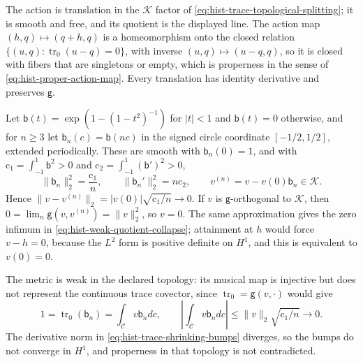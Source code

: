 The action is translation in the \(\mathcal K\) factor of
\eqref{eq:hist-trace-topological-splitting}; it is smooth and free, and its
quotient is the displayed line. The action map \((h,q)\mapsto(q+h,q)\) is a
homeomorphism onto the closed relation
\(\{(u,q):\operatorname{tr}_0(u-q)=0\}\), with inverse \((u,q)\mapsto(u-q,q)\),
so it is closed with fibers that are singletons or empty, which is properness
in the sense of \eqref{eq:hist-proper-action-map}. Every translation has
identity derivative and preserves \(\mathsf g\).

Let \(\mathsf b(t)=\exp(1-(1-t^2)^{-1})\) for \(|t|<1\) and \(\mathsf b(t)=0\)
otherwise, and for \(n\geq3\) let \(\mathsf b_n(c)=\mathsf b(nc)\) in the signed
circle coordinate \([-1/2,1/2]\), extended periodically. These are smooth with
\(\mathsf b_n(0)=1\), and with \(\mathrm c_1=\int_{-1}^1\mathsf b^2>0\) and
\(\mathrm c_2=\int_{-1}^1(\mathsf b')^2>0\),
\begin{equation}
\|\mathsf b_n\|_2^2=\frac{\mathrm c_1}{n},
\qquad
\|\mathsf b_n'\|_2^2=n\mathrm c_2,
\qquad
v^{(n)}=v-v(0)\mathsf b_n\in\mathcal K.
\label{eq:hist-trace-shrinking-bumps}
\end{equation}
Hence \(\|v-v^{(n)}\|_2=|v(0)|\sqrt{\mathrm c_1/n}\to0\). If \(v\) is
\(\mathsf g\)-orthogonal to \(\mathcal K\), then
\(0=\lim_n\mathsf g(v,v^{(n)})=\|v\|_2^2\), so \(v=0\). The same approximation
gives the zero infimum in \eqref{eq:hist-weak-quotient-collapse}; attainment at
\(h\) would force \(v-h=0\), because the \(L^2\) form is positive definite on
\(H^1\), and this is equivalent to \(v(0)=0\).

The metric is weak in the declared topology: its musical map is injective but
does not represent the continuous trace covector, since
\(\operatorname{tr}_0=\mathsf g(v,\cdot)\) would give
\begin{equation}
1=\operatorname{tr}_0(\mathsf b_n)=\int_{\mathcal C}v\mathsf b_ndc,
\qquad
\left|\int_{\mathcal C}v\mathsf b_ndc\right|
\leq\|v\|_2\sqrt{\mathrm c_1/n}\longrightarrow0.
\label{eq:hist-weak-musical-obstruction}
\end{equation}
The derivative norm in \eqref{eq:hist-trace-shrinking-bumps} diverges, so the
bumps do not converge in \(H^1\), and properness in that topology is not
contradicted.

